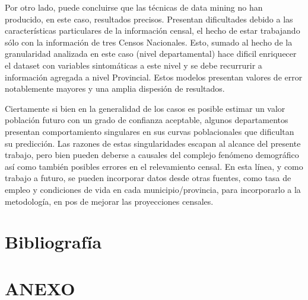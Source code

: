 \documentclass{article}
\theoremstyle{mytheoremstyle}
\theoremstyle{mytheoremstyle}
\theoremstyle{myproblemstyle}
\begin{document}
Por otro lado, puede concluirse que las técnicas de data mining no han producido, en este caso, resultados precisos. Presentan dificultades debido a las características particulares de la información censal, el hecho de estar trabajando sólo con la información de tres Censos Nacionales. Esto, sumado al hecho de la granularidad analizada en este caso (nivel departamental) hace dificil enriquecer el dataset con variables sintomáticas a este nivel y se debe recurrurir a información agregada
a nivel Provincial. Estos modelos presentan valores de error notablemente mayores y una amplia dispesión de resultados.\newline

Ciertamente si bien en la generalidad de los casos es posible estimar un valor población futuro con un grado de confianza aceptable, algunos departamentos presentan comportamiento singulares en sus curvas poblacionales que dificultan 
su predicción. Las razones de estas singularidades escapan al alcance del presente trabajo, pero bien pueden deberse a causales del complejo fenómeno demográfico así como también posibles errores en el relevamiento censal.
En esta línea, y como trabajo a futuro, se pueden incorporar datos desde otras fuentes, como tasa de empleo y condiciones de vida en cada municipio/provincia, para incorporarlo a la metodología, en pos de mejorar las proyecciones censales.



\section{Bibliografía}
\printbibliography%

\section{ANEXO}
\end{document}
